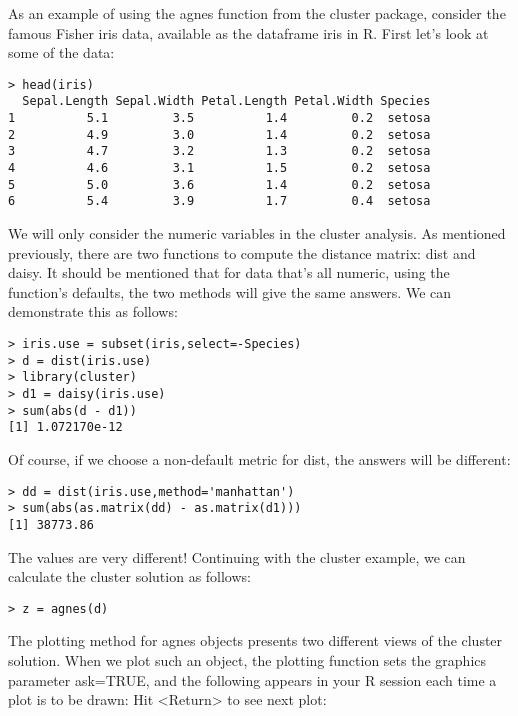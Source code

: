 As an example of using the agnes function from the cluster package, consider the famous Fisher iris data, available as the dataframe iris in R. First let's look at some of the data:
\begin{framed}
\begin{verbatim}
> head(iris)
  Sepal.Length Sepal.Width Petal.Length Petal.Width Species
1          5.1         3.5          1.4         0.2  setosa
2          4.9         3.0          1.4         0.2  setosa
3          4.7         3.2          1.3         0.2  setosa
4          4.6         3.1          1.5         0.2  setosa
5          5.0         3.6          1.4         0.2  setosa
6          5.4         3.9          1.7         0.4  setosa
\end{verbatim}
\end{framed}
We will only consider the numeric variables in the cluster analysis. As mentioned previously, there are two functions to compute the distance matrix: dist and daisy. It should be mentioned that for data that's all numeric, using the function's defaults, the two methods will give the same answers. We can demonstrate this as follows:
\begin{framed}
\begin{verbatim}
> iris.use = subset(iris,select=-Species)
> d = dist(iris.use)
> library(cluster)
> d1 = daisy(iris.use)
> sum(abs(d - d1))
[1] 1.072170e-12
\end{verbatim}
\end{framed}
Of course, if we choose a non-default metric for dist, the answers will be different:
\begin{framed}
\begin{verbatim}
> dd = dist(iris.use,method='manhattan')
> sum(abs(as.matrix(dd) - as.matrix(d1)))
[1] 38773.86
\end{verbatim}
\end{framed}
The values are very different!
Continuing with the cluster example, we can calculate the cluster solution as follows:
\begin{framed}
\begin{verbatim}
> z = agnes(d)
\end{verbatim}
\end{framed}
The plotting method for agnes objects presents two different views of the cluster solution. When we plot such an object, the plotting function sets the graphics parameter ask=TRUE, and the following appears in your R session each time a plot is to be drawn:
Hit <Return> to see next plot: 

